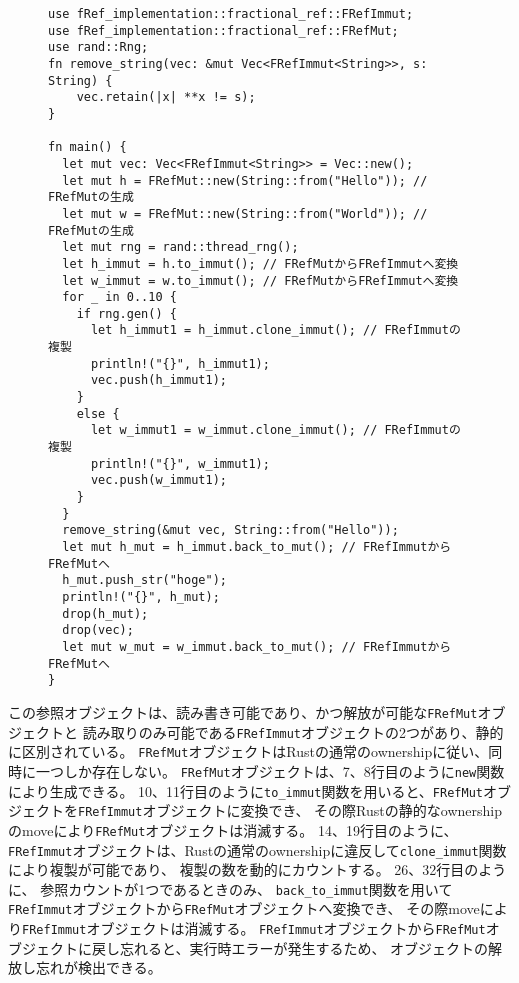 \documentclass{sumiilab-paper}
\theoremstyle{mystyle}
\numberwithin{definition}{chapter} %
\begin{document}
\begin{figure}[htp]
\begin{lstlisting}[caption=新たな参照オブジェクトを用いた柔軟なメモリ管理の例, 
  label=random_example, captionpos=b]
use fRef_implementation::fractional_ref::FRefImmut;
use fRef_implementation::fractional_ref::FRefMut;
use rand::Rng;
fn remove_string(vec: &mut Vec<FRefImmut<String>>, s: String) {
    vec.retain(|x| **x != s);
}

fn main() {
  let mut vec: Vec<FRefImmut<String>> = Vec::new();
  let mut h = FRefMut::new(String::from("Hello")); // FRefMutの生成
  let mut w = FRefMut::new(String::from("World")); // FRefMutの生成
  let mut rng = rand::thread_rng();
  let h_immut = h.to_immut(); // FRefMutからFRefImmutへ変換
  let w_immut = w.to_immut(); // FRefMutからFRefImmutへ変換
  for _ in 0..10 {
    if rng.gen() {
      let h_immut1 = h_immut.clone_immut(); // FRefImmutの複製
      println!("{}", h_immut1);
      vec.push(h_immut1);
    }
    else {
      let w_immut1 = w_immut.clone_immut(); // FRefImmutの複製
      println!("{}", w_immut1);
      vec.push(w_immut1);
    }
  }
  remove_string(&mut vec, String::from("Hello"));
  let mut h_mut = h_immut.back_to_mut(); // FRefImmutからFRefMutへ
  h_mut.push_str("hoge");
  println!("{}", h_mut);
  drop(h_mut);
  drop(vec);
  let mut w_mut = w_immut.back_to_mut(); // FRefImmutからFRefMutへ
}
\end{lstlisting}
\end{figure}

この参照オブジェクトは、読み書き可能であり、かつ解放が可能な\texttt{FRefMut}オブジェクトと
読み取りのみ可能である\texttt{FRefImmut}オブジェクトの2つがあり、静的に区別されている。
\texttt{FRefMut}オブジェクトはRustの通常のownershipに従い、同時に一つしか存在しない。
\texttt{FRefMut}オブジェクトは、7、8行目のように\texttt{new}関数により生成できる。
10、11行目のように\texttt{to\_immut}関数を用いると、\texttt{FRefMut}オブジェクトを\texttt{FRefImmut}オブジェクトに変換でき、
その際Rustの静的なownershipのmoveにより\texttt{FRefMut}オブジェクトは消滅する。
14、19行目のように、
\texttt{FRefImmut}オブジェクトは、Rustの通常のownershipに違反して\texttt{clone\_immut}関数により複製が可能であり、
複製の数を動的にカウントする。
26、32行目のように、
参照カウントが1つであるときのみ、
\texttt{back\_to\_immut}関数を用いて\texttt{FRefImmut}オブジェクトから\texttt{FRefMut}オブジェクトへ変換でき、
その際moveにより\texttt{FRefImmut}オブジェクトは消滅する。
\texttt{FRefImmut}オブジェクトから\texttt{FRefMut}オブジェクトに戻し忘れると、実行時エラーが発生するため、
オブジェクトの解放し忘れが検出できる。
\end{document}
